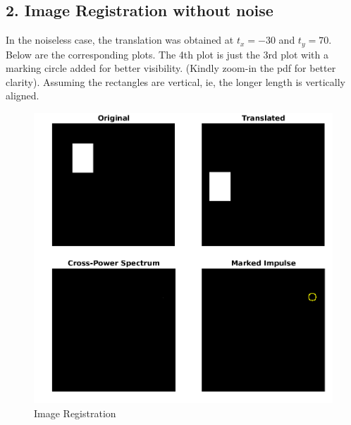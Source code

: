 \documentclass[12pt, a4paper]{article}
\begin{document}
\subsection*{2. Image Registration without noise}
In the noiseless case, the translation was obtained at $t_x = -30$ and $t_y = 70$. \\
Below are the corresponding plots. The 4th plot is just the 3rd plot with a marking circle added for better visibility. (Kindly zoom-in the pdf for better clarity). Assuming the rectangles are vertical, ie, the longer length is vertically aligned.
\vspace*{65pt}
\begin{figure}[h!]
    \centering
    \renewcommand{\thefigure}{5.1}
    \begin{minipage}[c][1\width]{0.7\textwidth}
    	\hspace*{-0.8in}
    	\includegraphics[width=1.34\textwidth]{noiseless.png}
    	\caption{Image Registration}
	    \label{fig:5.1}
    \end{minipage}    
\end{figure}
\vspace*{40pt}
\newpage
\end{document}
